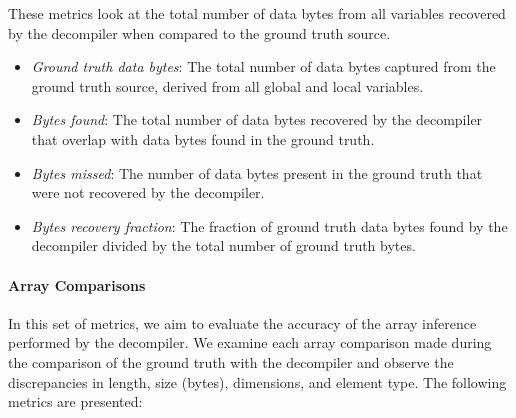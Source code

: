 \documentclass[conference]{IEEEtran}
\begin{document}
These metrics look at the total number of data bytes from all variables recovered by the decompiler when compared to the ground truth source.

\begin{itemize}
    \item \emph{Ground truth data bytes}: The total number of data bytes captured from the ground truth source, derived from all global and local variables.
    \item \emph{Bytes found}: The total number of data bytes recovered by the decompiler that overlap with data bytes found in the ground truth.
    \item \emph{Bytes missed}: The number of data bytes present in the ground truth that were not recovered by the decompiler.
    \item \emph{Bytes recovery fraction}: The fraction of ground truth data bytes found by the decompiler divided by the total number of ground truth bytes.
\end{itemize}

\paragraph{Array Comparisons}

In this set of metrics, we aim to evaluate the accuracy of the array inference performed by the decompiler. We examine each array comparison made during the comparison of the ground truth with the decompiler and observe the discrepancies in length, size (bytes), dimensions, and element type. The following metrics are presented:
\end{document}

